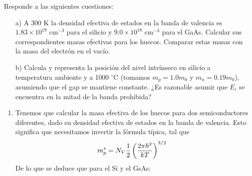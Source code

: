 \begin{texercise}
	Responde a las siguientes cuestiones:
	\begin{enumerate}
		\item[a)] A 300 K la densidad efectiva de estados en la banda de valencia es $1.83 \times 10^{19} \text{ cm}^{-3}$ para el silicio y $9.0 \times 10^{18} \text{ cm}^{-3}$ para el GaAs. Calcular sus correspondientes masas efectivas para los huecos. Comparar estas masas con la masa del electrón en el vacío.
		
		\item[b)] Calcula y representa la posición del nivel intrínseco en silicio a temperatura ambiente y a 1000 $^{\circ}$C (tomamos $m_p = 1.0m_0$ y $m_n = 0.19m_0$), asumiendo que el gap se mantiene constante. ¿Es razonable asumir que $E_i$ se encuentra en la mitad de la banda prohibida?
	\end{enumerate}
	\tcblower

	\begin{enumerate}[label=\alph*)]
		\item	Tenemos que calcular la masa efectiva de los huecos para dos semiconductores diferentes, dado su densidad efectiva de estados en la banda de valencia. Esto significa que necesitamos invertir la fórmula típica, tal que 
		\begin{equation}
			m_p^* = N_V  \frac{1}{2} \left( \frac{2 \pi \hbar^2}{kT} \right)^{3/2}
		\end{equation}
		De lo que se deduce que para el Si y el GsAs:


\end{enumerate}
\end{texercise}
